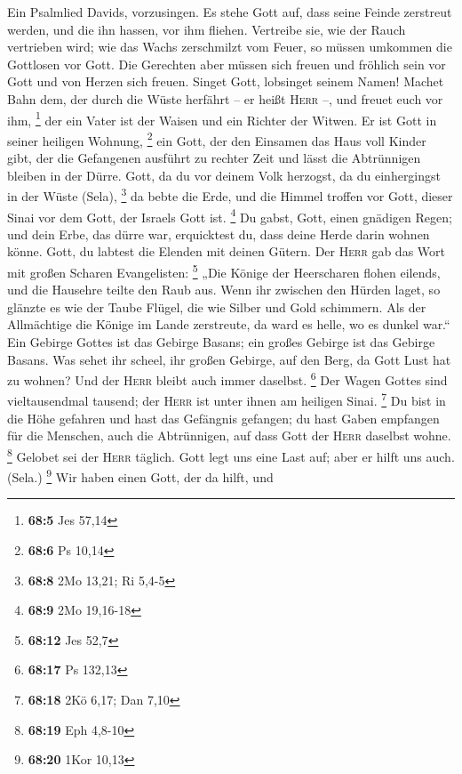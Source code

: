 Ein Psalmlied Davids, vorzusingen.  Es
stehe Gott auf, dass seine Feinde zerstreut werden, und die ihn hassen,
vor ihm fliehen.  Vertreibe sie, wie der Rauch vertrieben
wird; wie das Wachs zerschmilzt vom Feuer, so müssen umkommen die
Gottlosen vor Gott.  Die Gerechten aber müssen sich freuen
und fröhlich sein vor Gott und von Herzen sich freuen. 
Singet Gott, lobsinget seinem Namen! Machet Bahn dem, der durch die
Wüste herfährt -- er heißt \textsc{Herr} --, und freuet euch vor ihm,
\footnote{\textbf{68:5} Jes 57,14}  der ein Vater ist der
Waisen und ein Richter der Witwen. Er ist Gott in seiner heiligen
Wohnung, \footnote{\textbf{68:6} Ps 10,14}  ein Gott, der
den Einsamen das Haus voll Kinder gibt, der die Gefangenen ausführt zu
rechter Zeit und lässt die Abtrünnigen bleiben in der Dürre.
 Gott, da du vor deinem Volk herzogst, da du einhergingst
in der Wüste (Sela), \footnote{\textbf{68:8} 2Mo 13,21; Ri 5,4-5}
 da bebte die Erde, und die Himmel troffen vor Gott,
dieser Sinai vor dem Gott, der Israels Gott ist. \footnote{\textbf{68:9}
  2Mo 19,16-18}  Du gabst, Gott, einen gnädigen Regen;
und dein Erbe, das dürre war, erquicktest du,  dass deine
Herde darin wohnen könne. Gott, du labtest die Elenden mit deinen
Gütern.  Der \textsc{Herr} gab das Wort mit großen
Scharen Evangelisten: \footnote{\textbf{68:12} Jes 52,7} 
„Die Könige der Heerscharen flohen eilends, und die Hausehre teilte den
Raub aus.  Wenn ihr zwischen den Hürden laget, so glänzte
es wie der Taube Flügel, die wie Silber und Gold schimmern.
 Als der Allmächtige die Könige im Lande zerstreute, da
ward es helle, wo es dunkel war.``  Ein Gebirge Gottes
ist das Gebirge Basans; ein großes Gebirge ist das Gebirge Basans.
 Was sehet ihr scheel, ihr großen Gebirge, auf den Berg,
da Gott Lust hat zu wohnen? Und der \textsc{Herr} bleibt auch immer
daselbst. \footnote{\textbf{68:17} Ps 132,13}  Der Wagen
Gottes sind vieltausendmal tausend; der \textsc{Herr} ist unter ihnen am
heiligen Sinai. \footnote{\textbf{68:18} 2Kö 6,17; Dan 7,10}
 Du bist in die Höhe gefahren und hast das Gefängnis
gefangen; du hast Gaben empfangen für die Menschen, auch die
Abtrünnigen, auf dass Gott der \textsc{Herr} daselbst wohne. \footnote{\textbf{68:19}
  Eph 4,8-10}  Gelobet sei der \textsc{Herr} täglich.
Gott legt uns eine Last auf; aber er hilft uns auch. (Sela.) \footnote{\textbf{68:20}
  1Kor 10,13}  Wir haben einen Gott, der da hilft, und
